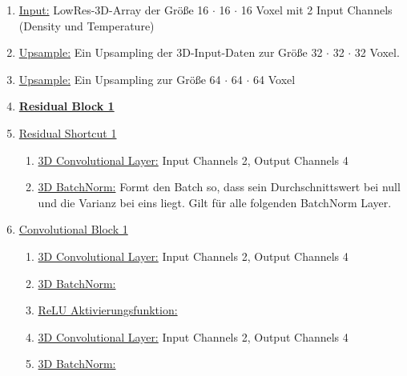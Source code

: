 \begin{enumerate}
    \item \underline{Input:} LowRes-3D-Array der Größe 16 $\cdot$ 16 $\cdot$ 16 Voxel mit 2 Input Channels (Density und Temperature)
    \item \underline{Upsample:} Ein Upsampling der 3D-Input-Daten zur Größe 32 $\cdot$ 32 $\cdot$ 32 Voxel.
    \item \underline{Upsample:} Ein Upsampling zur Größe 64 $\cdot$ 64 $\cdot$ 64 Voxel
    \item \underline{\textbf{Residual Block 1}} 
    \item[] \underline{Residual Shortcut 1} 
        \begin{enumerate}
            \item \underline{3D Convolutional Layer:} Input Channels 2, Output Channels 4
            \item \underline{3D BatchNorm:} Formt den Batch so, dass sein Durchschnittswert bei null und die Varianz bei eins liegt. Gilt für alle folgenden BatchNorm Layer.
        \end{enumerate}

    \item[] \underline{Convolutional Block 1}
        \begin{enumerate}
            \item \underline{3D Convolutional Layer:} Input Channels 2, Output Channels 4
            \item \underline{3D BatchNorm:}
            \item \underline{ReLU Aktivierungsfunktion:}
            \item \underline{3D Convolutional Layer:} Input Channels 2, Output Channels 4
            \item \underline{3D BatchNorm:}
        \end{enumerate}
        

\end{enumerate}
